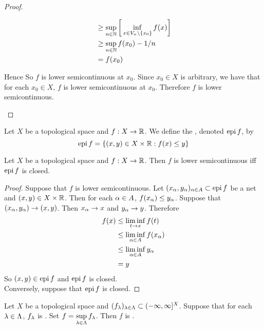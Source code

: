 \documentclass{book}
\begin{document}
\begin{proof}
\begin{itemize}
\begin{itemize}
\begin{align*}
				& \geq \sup_{n \in \mathbb{N}} \bigg[ \inf_{x \in V_n \setminus \{x_0\}} f(x) \bigg] \\
				& \geq \sup_{n \in \mathbb{N}} f(x_0)-1/n \\
				&= f(x_0) 
			\end{align*}
		\end{itemize}
		Hence So $f$ is lower semicontinuous at $x_0$. Since $x_0 \in X$ is arbitrary, we have that for each $x_0 \in X$, $f$ is lower semicontinuous at $x_0$. Therefore $f$ is lower semicontinuous.
	\end{itemize}
	\end{proof}

	\begin{defn}
		Let $X$ be a topological space and $f: X \rightarrow \mathbb{R}$. We define the , denoted $\operatorname{epi} f$, by 
		$$\operatorname{epi} f = \{(x, y) \in X \times \mathbb{R}: f(x) \leq y\}$$
	\end{defn}

	\begin{ex}
		Let $X$ be a topological space and $f: X \rightarrow \mathbb{R}$. Then $f$ is lower semicontinuous iff $\operatorname{epi} f$ is closed.
	\end{ex}

	\begin{proof}
		Suppose that $f$ is lower semicontinuous. Let $(x_{\alpha}, y_{\alpha})_{\alpha \in A} \subset \operatorname{epi} f$ be a net and $(x, y) \in X \times \mathbb{R}$. Then for each $\alpha \in A$, $f(x_{\alpha}) \leq y_{\alpha}$. Suppose that $(x_{\alpha}, y_{\alpha}) \rightarrow (x, y)$. Then $x_{\alpha} \rightarrow x$ and $y_{\alpha} \rightarrow y$. Therefore 
		\begin{align*}
			f(x) 
			& \leq \liminf_{t \rightarrow x} f(t) \\
			& \leq \liminf_{\alpha \in A} f(x_{\alpha}) \\
			& \leq \liminf_{\alpha \in A} y_{\alpha} \\
			&= y 
		\end{align*}
	So $(x, y) \in \operatorname{epi} f$ and $\operatorname{epi} f$ is closed. \\
	Conversely, suppose that $\operatorname{epi} f$ is closed. 
	\end{proof}

	\begin{ex}
		Let $X$ be a topological space and $ (f_{\lambda})_{\lambda \in \Lambda} \subset (-\infty, \infty]^X$. Suppose that for each $\lambda \in \Lambda$, $f_\lambda$ is \lsc. Set $f = \sup\limits_{\lambda \in \Lambda} f_{\lambda}$. Then $f$ is \lsc.
	\end{ex}
\end{document}
